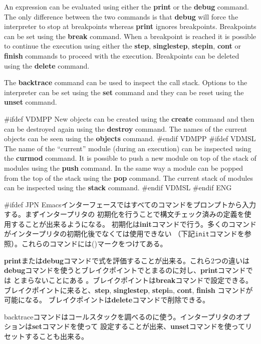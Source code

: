\documentclass[\pformat,12pt]{article}
\newcommand{\cmd}{\tt }
\begin{document}
An expression can be evaluated using
either the \textbf{print} or the \textbf{debug} command.  The only
difference between the two commands is that {\bf debug} will force
the interpreter to stop at breakpoints whereas {\bf print} ignores
breakpoints. Breakpoints can be set using
the \textbf{break} command. When a breakpoint is reached it is
possible to continue the execution using either the \textbf{step},
\textbf{singlestep}, \textbf{stepin}, \textbf{cont} or \textbf{finish}
commands to
proceed with the execution. Breakpoints can be deleted using the
\textbf{delete} command.

The \textbf{backtrace} command can be used to inspect the call stack.
Options to the interpreter can be set using the \textbf{set} command
and they can be reset using the \textbf{unset} command.

#ifdef VDMPP
New objects can be created using the \textbf{create} command and then
can be destroyed again using the \textbf{destroy} command. The names
of the current objects can be seen using the \textbf{objects} command.
#endif VDMPP
#ifdef VDMSL
The name of the ``current'' module (during an execution) can be
inspected using the \textbf{curmod} command. It is possible to push a
new module on top of the stack of modules using the \textbf{push}
command. In the same way a module can be popped from the top of the
stack using the \textbf{pop} command. The current stack of modules can
be inspected using the \textbf{stack} command.
#endif VDMSL
#endif ENG

#ifdef JPN
Emacsインターフェースではすべてのコマンドをプロンプトから入力する。まずインタープリタの
初期化を行うことで構文チェック済みの定義を使用することが出来るようになる。
初期化は\textbf{init}コマンドで行う。多くのコマンドがインタープリタの初期化後でなくては使用できない
（下記{\cmd init}コマンドを参照）。これらのコマンドには({\tt *})マークをつけてある。

\textbf{print}または\textbf{debug}コマンドで式を評価することが出来る。これら2つの違いは
{\bf debug}コマンドを使うとブレイクポイントでとまるのに対し、{\bf print}コマンドでは
とまらないことにある 。ブレイクポイントは\textbf{break}コマンドで設定できる。
ブレイクポイントに来ると、\textbf{step}, \textbf{singlestep}, \textbf{stepi}n, \textbf{cont}, \textbf{finish} 
コマンドが可能になる。
ブレイクポイントは\textbf{delete}コマンドで削除できる。

backtraceコマンドはコールスタックを調べるのに使う。インタープリタのオプションは\textbf{set}コマンドを使って
設定することが出来、\textbf{unset}コマンドを使ってリセットすることも出来る。
\end{document}
